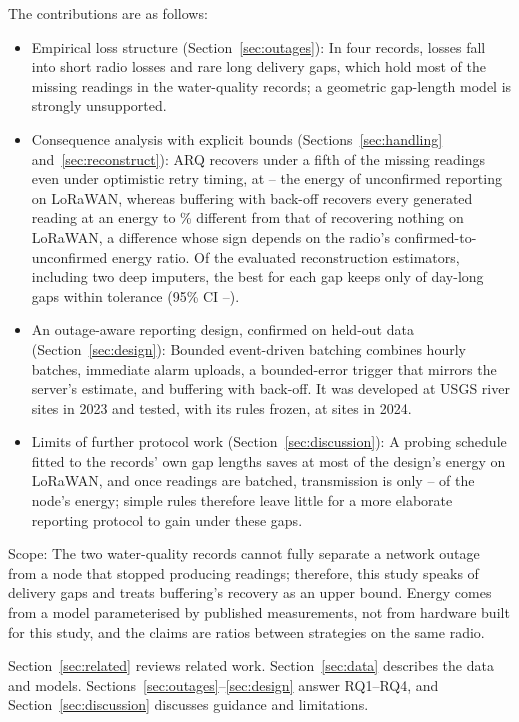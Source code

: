 The contributions are as follows:
\begin{itemize}
\item Empirical loss structure (Section~\ref{sec:outages}): In four records, losses fall into short radio losses and rare long delivery gaps, which hold most of the missing readings in the water-quality records; a geometric gap-length model is strongly unsupported.
\item Consequence analysis with explicit bounds (Sections~\ref{sec:handling} and~\ref{sec:reconstruct}): ARQ recovers under a fifth of the missing readings even under optimistic retry timing, at \arqRatioMin--\arqRatioMax{} the energy of unconfirmed reporting on LoRaWAN, whereas buffering with back-off recovers every generated reading at an energy \bufLoMin{} to \bufLoMax\% different from that of recovering nothing on LoRaWAN, a difference whose sign depends on the radio's confirmed-to-unconfirmed energy ratio. Of the evaluated reconstruction estimators, including two deep imputers, the best for each gap keeps only \recDayAll{} of day-long gaps within tolerance (95\% CI \recDayAllLo--\recDayAllHi).
\item An outage-aware reporting design, confirmed on held-out data (Section~\ref{sec:design}): Bounded event-driven batching combines hourly batches, immediate alarm uploads, a bounded-error trigger that mirrors the server's estimate, and buffering with back-off. It was developed at \designSites{} USGS river sites in 2023 and tested, with its rules frozen, at \confSites{} sites in 2024.
\item Limits of further protocol work (Section~\ref{sec:discussion}): A probing schedule fitted to the records' own gap lengths saves at most \probeSaveLoraMax{} of the design's energy on LoRaWAN, and once readings are batched, transmission is only \txShareFinalMin--\txShareFinalMax{} of the node's energy; simple rules therefore leave little for a more elaborate reporting protocol to gain under these gaps.
\end{itemize}

Scope: The two water-quality records cannot fully separate a network outage from a node that stopped producing readings; therefore, this study speaks of delivery gaps and treats buffering's recovery as an upper bound. Energy comes from a model parameterised by published measurements, not from hardware built for this study, and the claims are ratios between strategies on the same radio.

Section~\ref{sec:related} reviews related work. Section~\ref{sec:data} describes the data and models. Sections~\ref{sec:outages}--\ref{sec:design} answer RQ1--RQ4, and Section~\ref{sec:discussion} discusses guidance and limitations.

